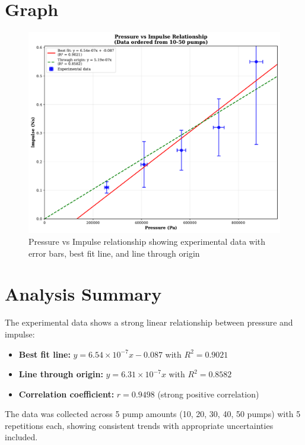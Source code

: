 \documentclass[11pt]{article}
\begin{document}
\newpage

\section{Graph}

\begin{figure}[H]
\centering
\includegraphics[width=\textwidth]{pressure_vs_impulse_updated.pdf}
\caption{Pressure vs Impulse relationship showing experimental data with error bars, best fit line, and line through origin}
\label{fig:pressure_impulse}
\end{figure}

\section{Analysis Summary}

The experimental data shows a strong linear relationship between pressure and impulse:

\begin{itemize}
\item \textbf{Best fit line:} $y = 6.54 \times 10^{-7}x - 0.087$ with $R^2 = 0.9021$
\item \textbf{Line through origin:} $y = 6.31 \times 10^{-7}x$ with $R^2 = 0.8582$
\item \textbf{Correlation coefficient:} $r = 0.9498$ (strong positive correlation)
\end{itemize}

The data was collected across 5 pump amounts (10, 20, 30, 40, 50 pumps) with 5 repetitions each, showing consistent trends with appropriate uncertainties included.
\end{document}
